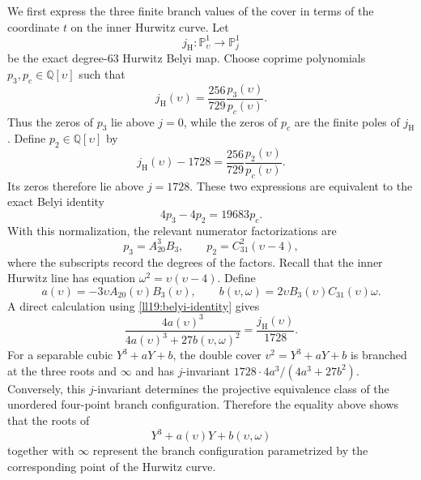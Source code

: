 \documentclass[10pt]{amsart}
\numberwithin{equation}{section}
\theoremstyle{definition}
\theoremstyle{remark}
\newcommand{\Q}{\mathbb{Q}}
\begin{document}
We first express the three finite branch values of the cover in terms of the
  coordinate $t$ on the inner Hurwitz curve.  Let
  \[
   j_{\mathrm H}\colon \mathbb P^1_{\upsilon}\longrightarrow\mathbb P^1_j
  \]
  be the exact degree-$63$ Hurwitz Belyi map.  Choose coprime polynomials
  $p_3,p_c\in\Q[\upsilon]$ such that
  \[
   j_{\mathrm H}(\upsilon)
     =\frac{256}{729}\frac{p_3(\upsilon)}{p_c(\upsilon)}.
  \]
  Thus the zeros of $p_3$ lie above $j=0$, while the zeros of $p_c$ are the
  finite poles of $j_{\mathrm H}$.  Define $p_2\in\Q[\upsilon]$ by
  \[
   j_{\mathrm H}(\upsilon)-1728
     =\frac{256}{729}\frac{p_2(\upsilon)}{p_c(\upsilon)}.
  \]
  Its zeros therefore lie above $j=1728$.  These two expressions are
  equivalent to the exact Belyi identity
  \begin{equation}\label{ll19:belyi-identity}
         4p_3-4p_2=19683p_c.
  \end{equation}
  With this normalization, the relevant numerator factorizations are
  \[
   p_3=A_{20}^3B_3,
   \qquad
   p_2=C_{31}^2(\upsilon-4),
  \]
  where the subscripts record the degrees of the factors. Recall that the inner Hurwitz line has equation $ \omega^2=\upsilon(\upsilon-4)$.
  Define
  \[
   a(\upsilon)
     =-3\upsilon A_{20}(\upsilon)B_3(\upsilon),
   \qquad
   b(\upsilon,\omega)
     =2\upsilon B_3(\upsilon)C_{31}(\upsilon)\omega.
  \]
  A direct calculation using \ref{ll19:belyi-identity} gives
  \[
   \frac{4a(\upsilon)^3}
   {4a(\upsilon)^3+27b(\upsilon,\omega)^2}
     =\frac{j_{\mathrm H}(\upsilon)}{1728}.
  \]
For a separable cubic $Y^3+aY+b$, the double cover
$v^2=Y^3+aY+b$ is branched at the three roots and $\infty$ and has
$j$-invariant $1728\cdot4a^3/(4a^3+27b^2)$. Conversely, this $j$-invariant
determines the projective equivalence class of the unordered four-point
branch configuration. Therefore the equality above shows that the roots of
  \[
   Y^3+a(\upsilon)Y+b(\upsilon,\omega)
  \]
  together with $\infty$ represent the branch configuration parametrized by
  the corresponding point of the Hurwitz curve.
\end{document}
